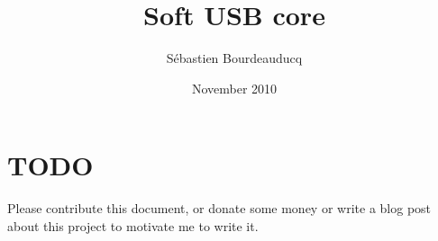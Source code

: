 \documentclass[a4paper,11pt]{article}
\title{Soft USB core}
\author{S\'ebastien Bourdeauducq}
\date{November 2010}
\begin{document}
\setlength{\parindent}{0pt}
\setlength{\parskip}{5pt}
\maketitle{}
\section{TODO}

Please contribute this document, or donate some money or write a blog post about this project to motivate me to write it.

\end{document}
